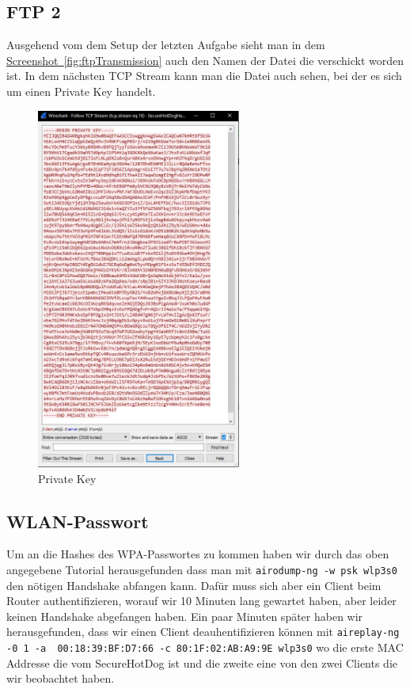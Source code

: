 \documentclass[12pt,a4paper,titlepage,oneside]{scrartcl}
\begin{document}
\subsection{FTP 2}

Ausgehend vom dem Setup der letzten Aufgabe sieht man in dem \hyperref[fig:ftpTransmission]{Screenshot~\ref*{fig:ftpTransmission}} auch den Namen der Datei die verschickt worden ist. In dem nächsten TCP Stream kann man die Datei auch sehen, bei der es sich um einen Private Key handelt.

\begin{figure}[h!]
  \centering
    \includegraphics[width=0.6\textwidth]{./imgs/intranet_screenshots/privateKey.png}
  \caption{Private Key}
  \label{fig:privateKey}
\end{figure}

\subsection{WLAN-Passwort} \label{wlanpwd}

Um an die Hashes des WPA-Passwortes zu kommen haben wir durch das oben angegebene Tutorial herausgefunden dass man mit \lstinline{airodump-ng -w psk wlp3s0} den nötigen Handshake abfangen kann. Dafür muss sich aber ein Client beim Router authentifizieren, worauf wir 10 Minuten lang gewartet haben, aber leider keinen Handshake abgefangen haben. Ein paar Minuten später haben wir herausgefunden, dass wir einen Client deauhentifizieren können mit \lstinline{aireplay-ng -0 1 -a  00:18:39:BF:D7:66 -c 80:1F:02:AB:A9:9E wlp3s0} wo die erste MAC Addresse die vom SecureHotDog ist und die zweite eine von den zwei Clients die wir beobachtet haben.
\end{document}
